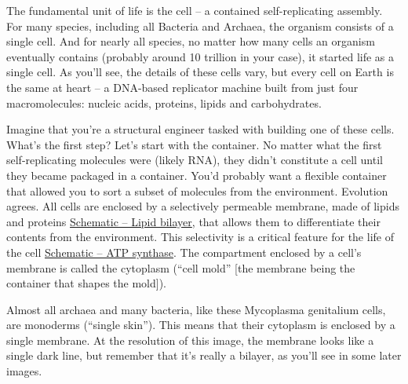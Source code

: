 \documentclass[]{book}
\begin{document}
The fundamental unit of life is the cell -- a contained self-replicating
assembly. For many species, including all Bacteria and Archaea, the
organism consists of a single cell. And for nearly all species, no
matter how many cells an organism eventually contains (probably around
10 trillion in your case), it started life as a single cell. As you'll
see, the details of these cells vary, but every cell on Earth is the
same at heart -- a DNA-based replicator machine built from just four
macromolecules: nucleic acids, proteins, lipids and carbohydrates.

Imagine that you're a structural engineer tasked with building one of
these cells. What's the first step? Let's start with the container. No
matter what the first self-replicating molecules were (likely RNA), they
didn't constitute a cell until they became packaged in a container.
You'd probably want a flexible container that allowed you to sort a
subset of molecules from the environment. Evolution agrees. All cells
are enclosed by a selectively permeable membrane, made of lipids and
proteins \protect\hyperlink{fig:2-1-1}{Schematic -- Lipid bilayer}, that
allows them to differentiate their contents from the environment. This
selectivity is a critical feature for the life of the cell
\protect\hyperlink{fig:2-1-2}{Schematic -- ATP synthase}. The
compartment enclosed by a cell's membrane is called the cytoplasm
(``cell mold'' {[}the membrane being the container that shapes the
mold{]}).

Almost all archaea and many bacteria, like these Mycoplasma genitalium
cells, are monoderms (``single skin''). This means that their cytoplasm
is enclosed by a single membrane. At the resolution of this image, the
membrane looks like a single dark line, but remember that it's really a
bilayer, as you'll see in some later images.
\end{document}
